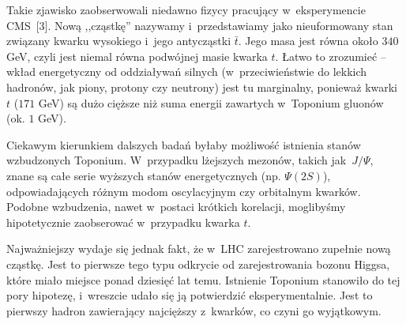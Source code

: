 Takie zjawisko zaobserwowali niedawno fizycy pracujący w~eksperymencie CMS~[3]. Nową ,,cząstkę'' nazywamy  i~przedstawiamy jako nieuformowany stan związany kwarku wysokiego i~jego antycząstki $\bar{t}$. Jego masa jest równa około $340$ GeV, czyli jest niemal równa podwójnej masie kwarka $t$. Łatwo to zrozumieć -- wkład energetyczny od oddziaływań silnych (w~przeciwieństwie do lekkich hadronów, jak piony, protony czy neutrony) jest tu marginalny, ponieważ kwarki $t$ ($171$ GeV) są dużo cięższe niż suma energii zawartych w~Toponium gluonów (ok. $1$ GeV).

Ciekawym kierunkiem dalszych badań byłaby możliwość istnienia stanów wzbudzonych Toponium. W~przypadku lżejszych mezonów, takich jak~$J/\Psi$, znane są całe serie wyższych stanów energetycznych (np. $\Psi (2S)$), odpowiadających różnym modom oscylacyjnym czy orbitalnym kwarków. Podobne wzbudzenia, nawet w~postaci krótkich korelacji, moglibyśmy hipotetycznie zaobserować w~przypadku kwarka $t$.


Najważniejszy wydaje się jednak fakt, że w~LHC zarejestrowano zupełnie nową cząstkę. Jest to pierwsze tego typu odkrycie od zarejestrowania bozonu Higgsa, które miało miejsce ponad dziesięć lat temu. Istnienie Toponium stanowiło do tej pory hipotezę, i~wreszcie udało się ją potwierdzić eksperymentalnie. Jest to pierwszy hadron zawierający najcięższy z~kwarków, co czyni go wyjątkowym.

